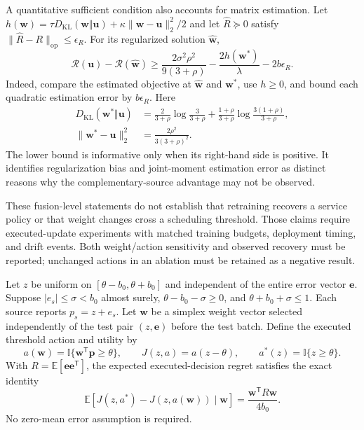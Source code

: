 A quantitative sufficient condition also accounts for matrix estimation.
Let $h(\boldsymbol w)=\tau D_{\mathrm{KL}}(\boldsymbol w\Vert\boldsymbol u)
+\kappa\|\boldsymbol w-\boldsymbol u\|_2^2/2$ and let $\widehat R\succeq0$
satisfy $\|\widehat R-R\|_{\mathrm{op}}\le\epsilon_R$.
For its regularized solution $\widehat{\boldsymbol w}$,
\begin{equation}
 \mathcal R(\boldsymbol u)-\mathcal R(\widehat{\boldsymbol w})
 \ge
 \frac{2\sigma^2\rho^2}{9(3+\rho)}
 -\frac{2h(\boldsymbol w^*)}{\lambda}-2b\epsilon_R.
 \label{eq:estimable-risk-gain}
\end{equation}
Indeed, compare the estimated objective at
$\widehat{\boldsymbol w}$ and $\boldsymbol w^*$, use $h\ge0$, and bound
each quadratic estimation error by $b\epsilon_R$.
Here
\begin{align}
 D_{\mathrm{KL}}(\boldsymbol w^*\Vert\boldsymbol u)
 &=\frac{2}{3+\rho}\log\frac{3}{3+\rho}
 +\frac{1+\rho}{3+\rho}\log\frac{3(1+\rho)}{3+\rho},\\
 \|\boldsymbol w^*-\boldsymbol u\|_2^2
 &=\frac{2\rho^2}{3(3+\rho)^2}.
\end{align}
The lower bound is informative only when its right-hand side is positive.
It identifies regularization bias and joint-moment estimation error as
distinct reasons why the complementary-source advantage may not be observed.

These fusion-level statements do not establish that retraining recovers a
service policy or that weight changes cross a scheduling threshold. Those
claims require executed-update experiments with matched training budgets,
deployment timing, and drift events. Both weight/action sensitivity and
observed recovery must be reported; unchanged actions in an ablation must
be retained as a negative result.

\begin{proposition}
\label{prop:threshold-decision-bridge}
Let $z$ be uniform on $[\theta-b_0,\theta+b_0]$ and independent of the
entire error vector $\boldsymbol e$. Suppose
$|e_s|\le\sigma<b_0$ almost surely,
$\theta-b_0-\sigma\ge0$, and $\theta+b_0+\sigma\le1$.
Each source reports $p_s=z+e_s$.
Let $\boldsymbol w$ be a simplex weight vector selected independently of
the test pair $(z,\boldsymbol e)$ before the test batch. Define the executed
threshold action and utility by
\begin{equation}
 a(\boldsymbol w)=\mathbb I\{\boldsymbol w^{\mathsf T}\boldsymbol p\ge\theta\},
 \qquad J(z,a)=a(z-\theta),
 \qquad a^*(z)=\mathbb I\{z\ge\theta\}.
\end{equation}
With $R=\mathbb E[\boldsymbol e\boldsymbol e^{\mathsf T}]$, the expected
executed-decision regret satisfies the exact identity
\begin{equation}
 \mathbb E[J(z,a^*)-J(z,a(\boldsymbol w))\mid\boldsymbol w]
 =\frac{\boldsymbol w^{\mathsf T}R\boldsymbol w}{4b_0}.
 \label{eq:exact-decision-regret}
\end{equation}
No zero-mean error assumption is required.
\end{proposition}


